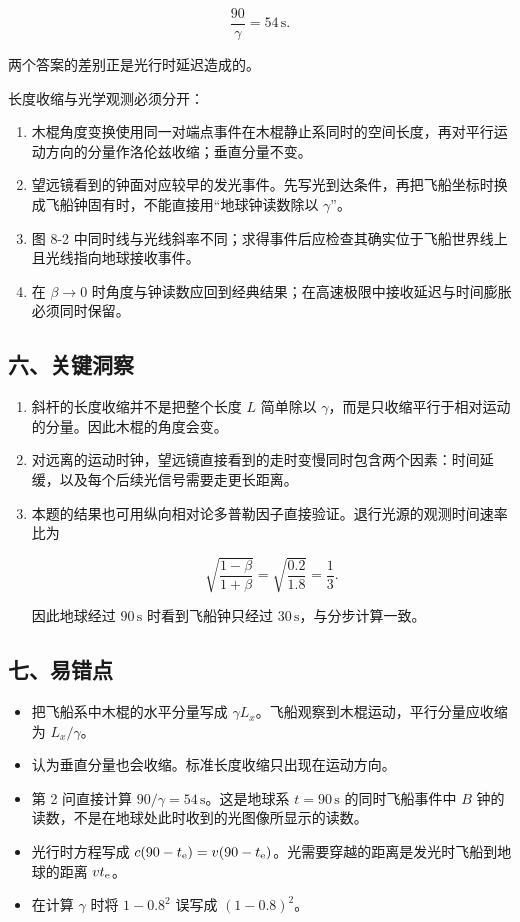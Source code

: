 \documentclass[12pt,a4paper,UTF8]{ctexart}
\newcommand{\tightlist}{\setlength{\itemsep}{0pt}\setlength{\parskip}{0pt}}
\begin{document}
\[
\frac{90}{\gamma}=54\,\mathrm s.
\]

两个答案的差别正是光行时延迟造成的。

长度收缩与光学观测必须分开：

\begin{enumerate}
\def\labelenumi{\arabic{enumi}.}
\tightlist
\item
  木棍角度变换使用同一对端点事件在木棍静止系同时的空间长度，再对平行运动方向的分量作洛伦兹收缩；垂直分量不变。
\item
  望远镜看到的钟面对应较早的发光事件。先写光到达条件，再把飞船坐标时换成飞船钟固有时，不能直接用``地球钟读数除以
  \(\gamma\)''。
\item
  图 8-2
  中同时线与光线斜率不同；求得事件后应检查其确实位于飞船世界线上且光线指向地球接收事件。
\item
  在 \(\beta\to0\)
  时角度与钟读数应回到经典结果；在高速极限中接收延迟与时间膨胀必须同时保留。
\end{enumerate}

\subsection{六、关键洞察}\label{ux516dux5173ux952eux6d1eux5bdf-7}

\begin{enumerate}
\def\labelenumi{\arabic{enumi}.}
\item
  斜杆的长度收缩并不是把整个长度 \(L\) 简单除以
  \(\gamma\)，而是只收缩平行于相对运动的分量。因此木棍的角度会变。
\item
  对远离的运动时钟，望远镜直接看到的走时变慢同时包含两个因素：时间延缓，以及每个后续光信号需要走更长距离。
\item
  本题的结果也可用纵向相对论多普勒因子直接验证。退行光源的观测时间速率比为

  \[
  \sqrt{\frac{1-\beta}{1+\beta}}
  =\sqrt{\frac{0.2}{1.8}}=\frac13.
  \]

  因此地球经过 \(90\,\mathrm s\) 时看到飞船钟只经过
  \(30\,\mathrm s\)，与分步计算一致。
\end{enumerate}

\subsection{七、易错点}\label{ux4e03ux6613ux9519ux70b9-7}

\begin{itemize}
\tightlist
\item
  把飞船系中木棍的水平分量写成
  \(\gamma L_x\)。飞船观察到木棍运动，平行分量应收缩为 \(L_x/\gamma\)。
\item
  认为垂直分量也会收缩。标准长度收缩只出现在运动方向。
\item
  第 2 问直接计算 \(90/\gamma=54\,\mathrm s\)。这是地球系
  \(t=90\,\mathrm s\) 的同时飞船事件中 \(B\)
  钟的读数，不是在地球处此时收到的光图像所显示的读数。
\item
  光行时方程写成
  \(c(90-t_{\rm e})=v(90-t_{\rm e})\)。光需要穿越的距离是发光时飞船到地球的距离
  \(vt_{\rm e}\)。
\item
  在计算 \(\gamma\) 时将 \(1-0.8^2\) 误写成 \((1-0.8)^2\)。
\end{itemize}
\end{document}
